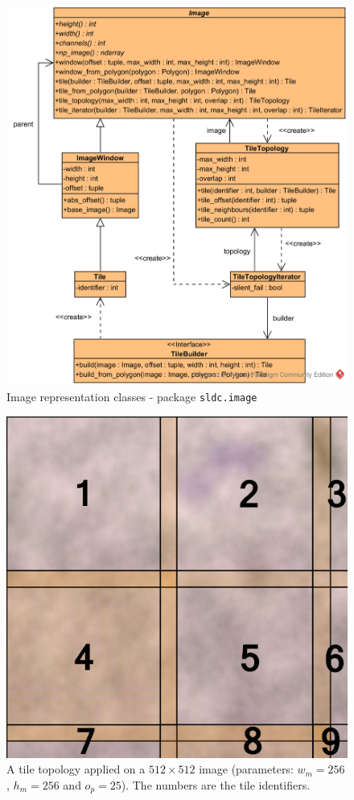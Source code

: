 \begin{figure}[h]
	\center 
	\includegraphics[scale=0.9]{image/uml_image_package.png}
	\caption{Image representation classes - package \texttt{sldc.image}}
	\label{fig:uml_image_package}
\end{figure}

\begin{figure}[h]
	\center
	\includegraphics[scale=0.5]{image/tile_topo_2048_2048.png}
	\caption{A tile topology applied on a $512\times 512$ image (parameters: $w_m = 256$, $h_m = 256$ and $o_p = 25$). The numbers are the tile identifiers.}
	\label{fig:tile_topo_example}
\end{figure}

